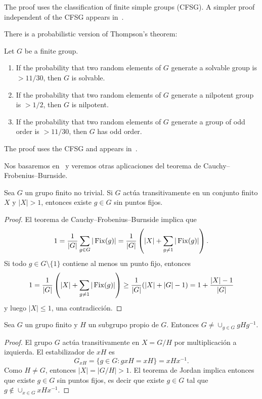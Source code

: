 The proof uses the classification of finite simple groups (CFSG). A simpler
proof independent of the CFSG appears in~\cite{MR1346207}.

There is a probabilistic version of Thompson's theorem:

\begin{theorem}
    Let $G$ be a finite group.
    \begin{enumerate}
        \item If the probability that two random elements of $G$ 
        generate a solvable group is $>11/30$, then $G$ is solvable. 
        \item If the probability that two random elements of $G$ 
        generate a nilpotent group is $>1/2$, then $G$ is nilpotent.
        \item If the probability that two random elements of $G$ 
        generate a group of odd order is $>11/30$, then $G$ has odd order.
    \end{enumerate}
\end{theorem}

The proof uses the CFSG and appears in~\cite{MR1770615}.



Nos basaremos en~\cite{MR1997347} y veremos otras aplicaciones del teorema de Cauchy--Frobenius--Burnside. 

\begin{theorem}[Jordan]
Sea $G$ un grupo finito no trivial. Si $G$ actúa transitivamente en un conjunto finito $X$ y $|X|>1$, entonces
existe $g\in G$ sin puntos fijos. 
\end{theorem}

\begin{proof}
El teorema de Cauchy--Frobenius--Burnside implica que
\[
1=\frac{1}{|G|}\sum_{g\in G}|\operatorname{Fix}(g)|=\frac{1}{|G|}\left(|X|+\sum_{g\ne 1}|\operatorname{Fix}(g)|\right).
\]
Si todo $g\in G\setminus\{1\}$ contiene al menos un punto fijo, entonces
\[
1=\frac{1}{|G|}\left(|X|+\sum_{g\ne 1}|\operatorname{Fix}(g)|\right)\geq \frac{1}{|G|}(|X|+|G|-1)=1+\frac{|X|-1}{|G|}
\]
y luego $|X|\leq1$, una contradicción. 
\end{proof}

\begin{corollary}
Sea $G$ un grupo finito y $H$ un subgrupo propio de $G$. Entonces $G\ne\cup_{g\in G}gHg^{-1}$.
\end{corollary}

\begin{proof}
El grupo $G$ actúa transitivamente en $X=G/H$ por multiplicación a izquierda. 
El estabilizador de $xH$ es 
\[
G_{xH}=\{g\in G:gxH=xH\}=xHx^{-1}.
\]
Como $H\ne G$, entonces $|X|=|G/H|>1$. El teorema de Jordan implica entonces que existe $g\in G$ sin puntos fijos, es decir
que existe $g\in G$ tal que $g\not\in\cup_{x\in G}xHx^{-1}$. 
\end{proof}

